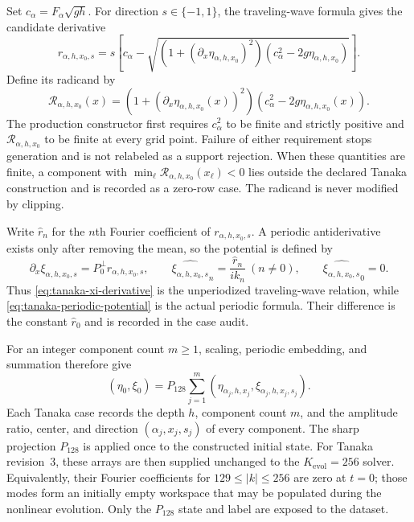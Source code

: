 \documentclass[11pt]{article}
\begin{document}
Set $c_\alpha=F_\alpha\sqrt{gh}$.  For direction
$s\in\{-1,1\}$, the traveling-wave formula gives the candidate derivative
\begin{equation}
  r_{\alpha,h,x_0,s}
  =s\left[c_\alpha-
    \sqrt{(1+(\partial_x\eta_{\alpha,h,x_0})^2)
           (c_\alpha^2-2g\eta_{\alpha,h,x_0})}\right].
  \label{eq:tanaka-xi-derivative}
\end{equation}
Define its radicand by
\begin{equation}
  \mathcal R_{\alpha,h,x_0}(x)
  =
  \left(1+(\partial_x\eta_{\alpha,h,x_0}(x))^2\right)
  \left(c_\alpha^2-2g\eta_{\alpha,h,x_0}(x)\right).
  \label{eq:tanaka-radicand}
\end{equation}
The production constructor first requires $c_\alpha^2$ to be finite and
strictly positive and $\mathcal R_{\alpha,h,x_0}$ to be finite at every grid
point.  Failure of either requirement stops generation and is not relabeled
as a support rejection.  When these quantities are finite, a component with
$\min_\ell\mathcal R_{\alpha,h,x_0}(x_\ell)<0$ lies outside the declared Tanaka
construction and is recorded as a zero-row case.  The radicand is never
modified by clipping.

Write $\widehat r_n$ for the $n$th Fourier coefficient of
$r_{\alpha,h,x_0,s}$.  A periodic antiderivative exists only after removing
the mean, so the potential is defined by
\begin{equation}
  \partial_x\xi_{\alpha,h,x_0,s}=P_0^\perp r_{\alpha,h,x_0,s},
  \qquad
  \widehat{\xi_{\alpha,h,x_0,s}}_n
    =\frac{\widehat r_n}{ik_n}\ (n\ne0),
  \qquad \widehat{\xi_{\alpha,h,x_0,s}}_0=0.
  \label{eq:tanaka-periodic-potential}
\end{equation}
Thus \eqref{eq:tanaka-xi-derivative} is the unperiodized traveling-wave
relation, while \eqref{eq:tanaka-periodic-potential} is the actual periodic
formula.  Their difference is the constant
$\widehat r_0$ and is recorded in the case audit.

For an integer component count $m\geq1$, scaling, periodic embedding, and
summation therefore give
\begin{equation}
  (\eta_0,\xi_0)
  =P_{128}\sum_{j=1}^{m}
   (\eta_{\alpha_j,h,x_j},\xi_{\alpha_j,h,x_j,s_j}).
  \label{eq:tanaka-constructor}
\end{equation}
Each Tanaka case records the depth $h$, component count $m$, and the amplitude
ratio, center, and direction $(\alpha_j,x_j,s_j)$ of every component.
The sharp projection $P_{128}$ is applied once to the constructed initial
state.  For Tanaka revision~3, these arrays are then supplied unchanged to the
$K_{\mathrm{evol}}=256$ solver.  Equivalently, their Fourier coefficients for
$129\leq |k|\leq256$ are zero at $t=0$; those modes form an initially empty
workspace that may be populated during the nonlinear evolution.  Only the
$P_{128}$ state and label are exposed to the dataset.
\end{document}
